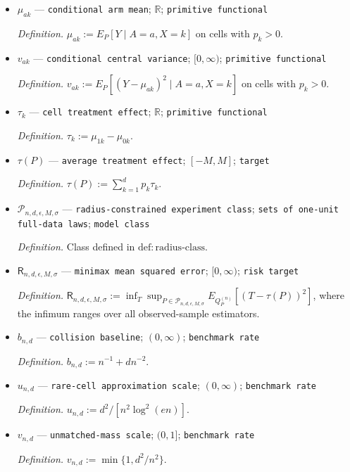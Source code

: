 \documentclass{article}
\begin{document}
\begin{itemize}
  \item \(\mu_{ak}\) --- \texttt{conditional arm mean}; \(\mathbb R\); \texttt{primitive functional}
  \par\smallskip\noindent\emph{Definition.} \(\mu_{ak}:=E_P[Y\mid A=a,X=k]\) on cells with \(p_k>0\).
  \item \(v_{ak}\) --- \texttt{conditional central variance}; \([0,\infty)\); \texttt{primitive functional}
  \par\smallskip\noindent\emph{Definition.} \(v_{ak}:=E_P[(Y-\mu_{ak})^2\mid A=a,X=k]\) on cells with \(p_k>0\).
  \item \(\tau_k\) --- \texttt{cell treatment effect}; \(\mathbb R\); \texttt{primitive functional}
  \par\smallskip\noindent\emph{Definition.} \(\tau_k:=\mu_{1k}-\mu_{0k}\).
  \item \(\tau(P)\) --- \texttt{average treatment effect}; \([-M,M]\); \texttt{target}
  \par\smallskip\noindent\emph{Definition.} \(\tau(P):=\sum_{k=1}^d p_k\tau_k\).
  \item \(\mathcal P_{n,d,\epsilon,M,\sigma}\) --- \texttt{radius-\allowbreak{}constrained experiment class}; \texttt{sets of one-\allowbreak{}unit full-\allowbreak{}data laws}; \texttt{model class}
  \par\smallskip\noindent\emph{Definition.} Class defined in \(\mathrm{def:radius\text{-}class}\).
  \item \(\mathsf R_{n,d,\epsilon,M,\sigma}\) --- \texttt{minimax mean squared error}; \([0,\infty)\); \texttt{risk target}
  \par\smallskip\noindent\emph{Definition.} \(\mathsf R_{n,d,\epsilon,M,\sigma}:=\inf_T\sup_{P\in\mathcal P_{n,d,\epsilon,M,\sigma}}E_{Q_P^{(n)}}[(T-\tau(P))^2]\), where the infimum ranges over all observed-sample estimators.
  \item \(b_{n,d}\) --- \texttt{collision baseline}; \((0,\infty)\); \texttt{benchmark rate}
  \par\smallskip\noindent\emph{Definition.} \(b_{n,d}:=n^{-1}+dn^{-2}\).
  \item \(u_{n,d}\) --- \texttt{rare-\allowbreak{}cell approximation scale}; \((0,\infty)\); \texttt{benchmark rate}
  \par\smallskip\noindent\emph{Definition.} \(u_{n,d}:=d^2/[n^2\log^2(en)]\).
  \item \(v_{n,d}\) --- \texttt{unmatched-\allowbreak{}mass scale}; \((0,1]\); \texttt{benchmark rate}
  \par\smallskip\noindent\emph{Definition.} \(v_{n,d}:=\min\{1,d^2/n^2\}\).

\end{itemize}
\end{document}
